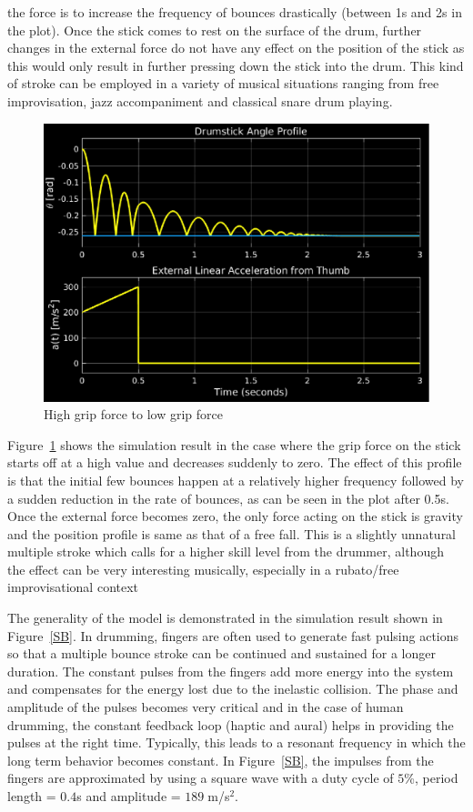 \documentclass[final,1p,times]{elsarticle}
\begin{document}
\noindent the force is to increase the frequency of bounces drastically (between 1s and 2s in the plot). Once the stick comes to rest on the surface of the drum, further changes in the external force do not have any effect on the position of the stick as this would only result in further pressing down the stick into the drum. This kind of stroke can be employed in a variety of musical situations ranging from free improvisation, jazz accompaniment and classical snare drum playing.
\begin{figure}[H]
	\begin{center}
		\includegraphics[scale =0.67]{./figures/Fig6.eps}
		\caption{High grip force to low grip force}
		\label{HL}
	\end{center}
\end{figure}


Figure~\ref{HL} shows the simulation result in the case where the grip force on the stick starts off at a high value and decreases suddenly to zero. The effect of this profile is that the initial few bounces happen at a relatively higher frequency followed by a sudden reduction in the rate of bounces, as can be seen in the plot after 0.5s. Once the external force becomes zero, the only force acting on the stick is gravity and the position profile is same as that of a free fall. This is a slightly unnatural multiple stroke which calls for a higher skill level from the drummer, although the effect can be very interesting musically, especially in a rubato/free improvisational context

The generality of the model is demonstrated in the simulation result shown in Figure~\ref{SB}.
In drumming, fingers are often used to generate fast pulsing actions so that a multiple
bounce stroke can be continued and sustained for a longer duration. The constant pulses
from the fingers add more energy into the system and compensates for the energy lost due
to the inelastic collision. The phase and amplitude of the pulses becomes very critical and in the case of human drumming, the constant feedback loop (haptic and aural) helps in providing the pulses at the right time. Typically, this leads to a resonant frequency in which the long term behavior becomes constant. In Figure~\ref{SB}, the impulses from the fingers are approximated by using a square wave with a duty cycle of $5$\%, period length = $0.4$s and amplitude = $189\;$m/s$^2$.
\end{document}
